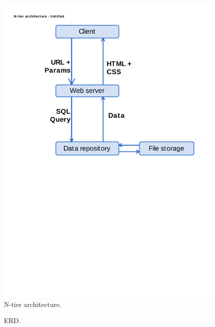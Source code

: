 \begin{figure}
                \includegraphics[scale=0.35]{img/ntier.pdf}
                \caption{N-tier architecture.}
                \label{img:arch-ntier}
\end{figure}
\begin{figure}
                \caption{ERD.}
                \label{img:arch-ntier}
\end{figure}
